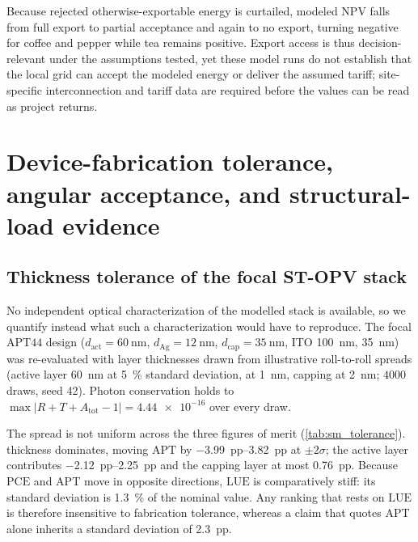 \documentclass[preprint,12pt,a4paper]{elsarticle}
\begin{document}
Because rejected otherwise-exportable energy is curtailed, modeled NPV falls from full export to partial acceptance and again to no export, turning negative for coffee and pepper while tea remains positive. Export access is thus decision-relevant under the assumptions tested, yet these model runs do not establish that the local grid can accept the modeled energy or deliver the assumed tariff; site-specific interconnection and tariff data are required before the values can be read as project returns.

\section{Device-fabrication tolerance, angular acceptance, and structural-load evidence}
\label{sec:sm_device_struct}

\subsection{Thickness tolerance of the focal ST-OPV stack}
\label{sec:sm_tolerance}

No independent optical characterization of the modelled stack is available, so we quantify instead what such a characterization would have to reproduce. The focal $\mathrm{APT44}$ design ($d_{\mathrm{act}}=\qty{60}{\nano\meter}$, $d_{\mathrm{Ag}}=\qty{12}{\nano\meter}$, $d_{\mathrm{cap}}=\qty{35}{\nano\meter}$, ITO \qty{100}{\nano\meter},  \qty{35}{\nano\meter}) was re-evaluated with layer thicknesses drawn from illustrative roll-to-roll spreads (active layer \qty{60}{\nano\meter} at \qty{5}{\percent} standard deviation,  at \qty{1}{\nano\meter}, capping  at \qty{2}{\nano\meter}; $\num{4000}$ draws, seed 42). Photon conservation holds to $\max|R+T+A_{\mathrm{tot}}-1|=\num{4.44e-16}$ over every draw.

The spread is not uniform across the three figures of merit (\cref{tab:sm_tolerance}).  thickness dominates, moving $\mathrm{APT}$ by \qtyrange{-3.99}{+3.82}{pp} at $\pm2\sigma$; the active layer contributes \qtyrange{-2.12}{+2.25}{pp} and the capping layer at most \qty{0.76}{pp}. Because $\mathrm{PCE}$ and $\mathrm{APT}$ move in opposite directions, $\mathrm{LUE}$ is comparatively stiff: its standard deviation is \qty{1.3}{\percent} of the nominal value. Any ranking that rests on $\mathrm{LUE}$ is therefore insensitive to fabrication tolerance, whereas a claim that quotes $\mathrm{APT}$ alone inherits a standard deviation of \qty{2.3}{pp}.
\end{document}
